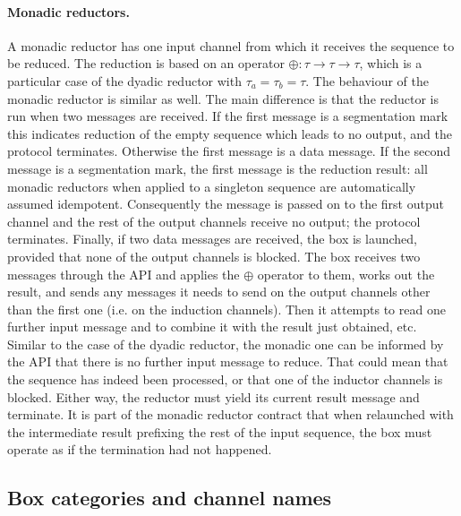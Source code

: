 \documentclass[11pt]{report}
\begin{document}
\paragraph{Monadic reductors.} A monadic reductor has one input channel from which it receives the sequence to be reduced. The reduction is based on an operator
$\oplus:\tau\to\tau\to\tau$, which is a particular case of the dyadic reductor with $\tau_a=\tau_b=\tau$.  The behaviour of the monadic reductor is similar as well.
The main difference is that the reductor is run when two messages are received. If the first message is a segmentation mark this indicates reduction of the empty sequence which leads to no output, and the protocol terminates. Otherwise the first message is a data message. If the second message is a segmentation mark, the first message is the reduction result: all monadic reductors when applied to a singleton sequence are automatically assumed idempotent. Consequently the message is passed on to the first output channel and the rest of the output channels receive no output; the protocol terminates. Finally, if two data messages are received, the box is launched, provided that none of the output channels is blocked. The box receives two messages through the API and applies the $\oplus$ operator to them, works out the result, and sends any messages it needs to send on the output channels other than the first one (i.e. on the induction channels). Then it attempts to read one further input message and to combine it with the result just obtained, etc. Similar to the case of the dyadic reductor,  the monadic one can be informed by the API that there is no further input message to reduce. That could mean that the sequence has indeed been processed, or that one of the inductor channels is blocked. Either way, the reductor must yield its current result message and terminate. It is part of the monadic reductor contract that when relaunched with the intermediate result prefixing the rest of the input sequence, the box must operate as if the termination had not happened.

\subsection{Box categories and channel names\label{sec:category}}
\end{document}
